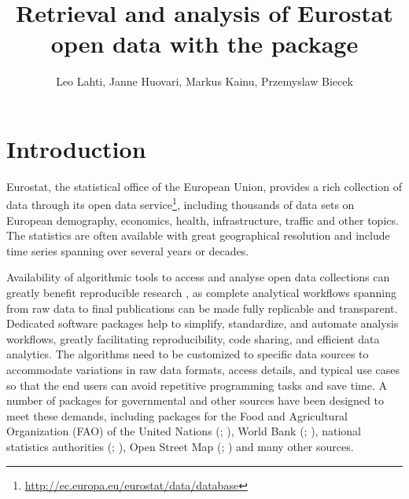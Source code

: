 \title{Retrieval and analysis of Eurostat open data with the  package}
\author{Leo Lahti, Janne Huovari, Markus Kainu, Przemyslaw Biecek}

\maketitle



\section{Introduction}

Eurostat, the statistical office of the European Union, provides a
rich collection of data through its open data
service\footnote{\url{http://ec.europa.eu/eurostat/data/database}},
including thousands of data sets on European demography, economics,
health, infrastructure, traffic and other topics. The statistics are
often available with great geographical resolution and include time
series spanning over several years or decades.

Availability of algorithmic tools to access and analyse open data
collections can greatly benefit reproducible
research \citep{Gandrud13, Boettiger2015}, as complete analytical
workflows spanning from raw data to final publications can be made
fully replicable and transparent. Dedicated software packages help to
simplify, standardize, and automate analysis workflows, greatly
facilitating reproducibility, code sharing, and efficient data
analytics. The algorithms need to be customized to specific data
sources to accommodate variations in raw data formats, access details,
and typical use cases so that the end users can avoid repetitive
programming tasks and save time. A number of packages for governmental
and other sources have been designed to meet these demands, including
packages for the Food and Agricultural Organization (FAO) of the
United Nations (; \cite{FAOSTAT}), World Bank
(; \cite{WDI}), national statistics authorities
(; \cite{pxweb}), Open Street Map
(; \cite{osmar}) and many other sources.

